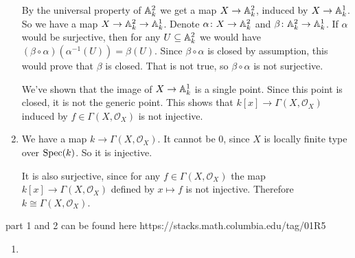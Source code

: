 \begin{exercise}{3}
\begin{enumerate}
{                By the universal property of $\mathbb{A}^2_k$ we get a map $X \to
                \mathbb{A}^2_k$, induced by $X \to \mathbb{A}^1_k$.
                So we have a map $X \to \mathbb{A}^2_k \to \mathbb{A}^1_k$.
                Denote $\alpha \colon X \to \mathbb{A}^2_k$ and $\beta \colon \mathbb{A}^2_k
                \to \mathbb{A}^1_k$.
                If $\alpha$ would be surjective, then for any $U \subseteq
                \mathbb{A}^2_k$ we would have $(\beta \circ \alpha)(\alpha^{-1}(U)) =
                \beta(U)$. Since $\beta \circ \alpha$ is closed by assumption,
                this would prove that $\beta$ is closed. That is not true, so
                $\beta \circ \alpha$ is not surjective.

                We've shown that the image of $X \to \mathbb{A}^1_k$ is a single
                point. Since this point is closed, it is not the generic point.
                This shows that $k[x] \to \Gamma(X, \mathcal{O}_X)$ induced by
                $f \in \Gamma(X, \mathcal{O}_X)$ is not injective.
            }
        \item{
                We have a map $k \to \Gamma(X, \mathcal{O}_X)$. It cannot be
                $0$, since $X$ is locally finite type over $\operatorname{Spec}(k)$. So it is
                injective.

                It is also surjective, since for any $f \in \Gamma(X,
                \mathcal{O}_X)$ the map $k[x] \to \Gamma(X, \mathcal{O}_X)$
                defined by $x \mapsto f$ is not injective. Therefore $k \cong
                \Gamma(X, \mathcal{O}_X)$.
            }
    \end{enumerate}
\end{exercise}

\begin{exercise}{4}
    part 1 and 2 can be found here 
    https://stacks.math.columbia.edu/tag/01R5

    \begin{enumerate}
        \item 
    \end{enumerate}
\end{exercise}


